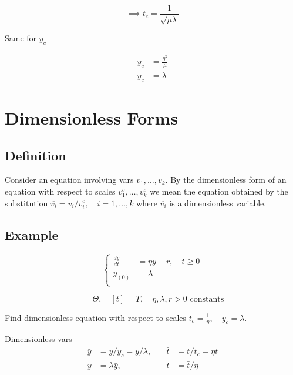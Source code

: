 \documentclass[12pt]{article}
\begin{document}
\begin{equation}
  \implies t_c = \frac{1}{\sqrt{\mu\lambda}}
\end{equation}

Same for $y_c$

\begin{equation}
  \begin{aligned}
    y_c &= \frac{\eta^2}{\mu} \\
    y_c &= \lambda
  \end{aligned}
\end{equation}

\newpage
\section{Dimensionless Forms}
\subsection{Definition}
Consider an equation involving vars $v_1,\ldots,v_k$. By the dimensionless form
of an equation with respect to scales $v_1^c,\ldots,v_k^c$ we mean the equation
obtained by the substitution $\overline{v_i}=v_i/v_i^c,\quad i=1,\ldots,k$ where
$\overline{v_i}$ is a dimensionless variable.

\subsection{Example}
\begin{equation}
  \left\{
  \begin{aligned}
    \frac{dy}{dt} &= \eta y+r, \quad t\ge0 \\
    y_{(0)} &= \lambda \\
  \end{aligned}
  \right.
\end{equation}

\begin{equation}
  [y] = \Theta,\quad[t]=T,\quad \eta,\lambda,r > 0 \text{ constants}
\end{equation}

Find dimensionless equation with respect to scales
$t_c=\frac{1}{\eta},\quad y_c=\lambda$.

Dimensionless vars
\begin{equation}
  \begin{aligned}
    \bar{y} &= y/y_c = y/\lambda,\quad & \bar{t} &= t/t_c = \eta t \\
    y &= \lambda \bar{y}, \quad & t&=\bar{t}/\eta \\
  \end{aligned}
\end{equation}
\end{document}
